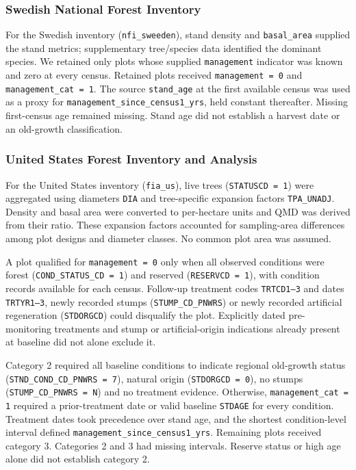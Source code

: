 \documentclass{myreport}
\begin{document}
% 

\subsubsection{Swedish National Forest Inventory}
For the Swedish inventory (\texttt{nfi\_sweeden}), stand density and \texttt{basal\_area} supplied the stand metrics; supplementary tree/species data identified the dominant species. We retained only plots whose supplied \texttt{management} indicator was known and zero at every census. Retained plots received \texttt{management = 0} and \texttt{management\_cat = 1}. The source \texttt{stand\_age} at the first available census was used as a proxy for \texttt{management\_since\_census1\_yrs}, held constant thereafter. Missing first-census age remained missing. Stand age did not establish a harvest date or an old-growth classification.

% 

\subsubsection{United States Forest Inventory and Analysis}
For the United States inventory (\texttt{fia\_us}), live trees (\texttt{STATUSCD = 1}) were aggregated using diameters \texttt{DIA} and tree-specific expansion factors \texttt{TPA\_UNADJ}. Density and basal area were converted to per-hectare units and QMD was derived from their ratio. These expansion factors accounted for sampling-area differences among plot designs and diameter classes. No common plot area was assumed.

A plot qualified for \texttt{management = 0} only when all observed conditions were forest (\texttt{COND\_STATUS\_CD = 1}) and reserved (\texttt{RESERVCD = 1}), with condition records available for each census. Follow-up treatment codes \texttt{TRTCD1--3} and dates \texttt{TRTYR1--3}, newly recorded stumps (\texttt{STUMP\_CD\_PNWRS}) or newly recorded artificial regeneration (\texttt{STDORGCD}) could disqualify the plot. Explicitly dated pre-monitoring treatments and stump or artificial-origin indications already present at baseline did not alone exclude it.

Category 2 required all baseline conditions to indicate regional old-growth status (\texttt{STND\_COND\_CD\_PNWRS = 7}), natural origin (\texttt{STDORGCD = 0}), no stumps (\texttt{STUMP\_CD\_PNWRS = N}) and no treatment evidence. Otherwise, \texttt{management\_cat = 1} required a prior-treatment date or valid baseline \texttt{STDAGE} for every condition. Treatment dates took precedence over stand age, and the shortest condition-level interval defined \texttt{management\_since\_census1\_yrs}. Remaining plots received category 3. Categories 2 and 3 had missing intervals. Reserve status or high age alone did not establish category 2.
\end{document}
